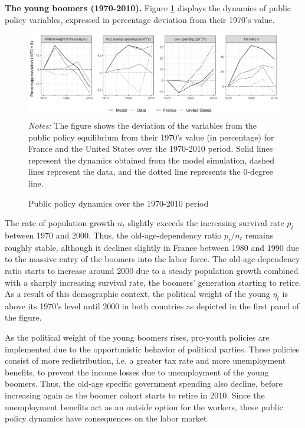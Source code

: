 \textbf{The young boomers (1970-2010).} 
Figure \ref{chap1-fig:quant-bench-dev7010-pub} displays the dynamics of public policy variables, expressed in percentage deviation from their 1970's value.
\begin{figure}[!tb]
	\centering
	\caption{Public policy dynamics over the 1970-2010 period} \label{chap1-fig:quant-bench-dev7010-pub}
	\includegraphics[width=1\linewidth]{chap1/graphic/quant-bench-dev7010-pub.png}
	\vspace{-3em}
	\justify\singlespacing\footnotesize\textit{Notes:} The figure shows the deviation of the variables from the public policy equilibrium from their 1970's value (in percentage) for France and the United States over the 1970-2010 period. Solid lines represent the dynamics obtained from the model simulation, dashed  lines represent the data, and the dotted line represents the 0-degree line.
\end{figure}
The rate of population growth $n_t$ slightly exceeds the increasing survival rate $p_t$ between 1970 and 2000. Thus, the old-age-dependency ratio $p_t/n_t$ remains roughly stable, although it declines slightly in France between 1980 and 1990 due to the massive entry of the boomers into the labor force. The old-age-dependency ratio starts to increase around 2000 due to a steady population growth combined with a sharply increasing survival rate, the boomers' generation starting to retire. As a result of this demographic context, the political weight of the young $\eta_t$ is above its 1970's level until 2000 in both countries as depicted in the first panel of the figure.

As the political weight of the young boomers rises, pro-youth policies are implemented due to the opportunistic behavior of political parties. These policies consist of more redistribution, i.e. a greater tax rate and more unemployment benefits, to prevent the income losses due to unemployment of the young boomers. Thus, the old-age specific government spending also decline, before increasing again as the boomer cohort starts to retire in 2010. Since the unemployment benefits act as an outside option for the workers, these public policy dynamics have consequences on the labor market.

